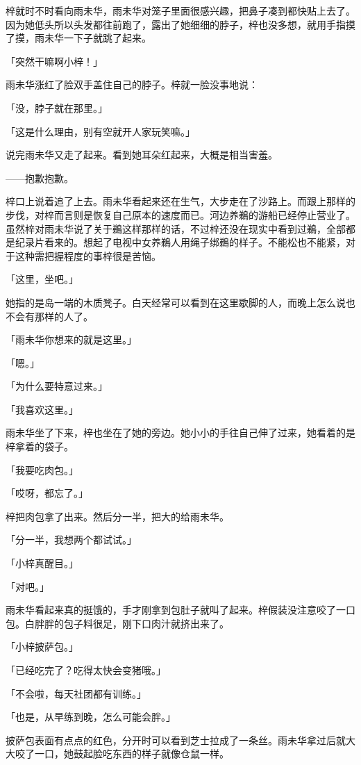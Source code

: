 \documentclass[UTF8]{ctexart}
\begin{document}
    梓就时不时看向雨未华，雨未华对笼子里面很感兴趣，把鼻子凑到都快贴上去了。因为她低头所以头发都往前跑了，露出了她细细的脖子，梓也没多想，就用手指摸了摸，雨未华一下子就跳了起来。

    「突然干嘛啊小梓！」

    雨未华涨红了脸双手盖住自己的脖子。梓就一脸没事地说：

    「没，脖子就在那里。」

    「这是什么理由，别有空就开人家玩笑嘛。」

    说完雨未华又走了起来。看到她耳朵红起来，大概是相当害羞。

    ——抱歉抱歉。

    梓口上说着追了上去。雨未华看起来还在生气，大步走在了沙路上。而跟上那样的步伐，对梓而言则是恢复自己原本的速度而已。河边养鵜的游船已经停止营业了。虽然梓对雨未华说了关于鵜这样那样的话，不过梓还没在现实中看到过鵜，全部都是纪录片看来的。想起了电视中女养鵜人用绳子绑鵜的样子。不能松也不能紧，对于这种需把握程度的事梓很是苦恼。

    「这里，坐吧。」

    她指的是岛一端的木质凳子。白天经常可以看到在这里歇脚的人，而晚上怎么说也不会有那样的人了。

    「雨未华你想来的就是这里。」

    「嗯。」

    「为什么要特意过来。」

    「我喜欢这里。」

    雨未华坐了下来，梓也坐在了她的旁边。她小小的手往自己伸了过来，她看着的是梓拿着的袋子。

    「我要吃肉包。」

    「哎呀，都忘了。」

    梓把肉包拿了出来。然后分一半，把大的给雨未华。

    「分一半，我想两个都试试。」

    「小梓真醒目。」

    「对吧。」

    雨未华看起来真的挺饿的，手才刚拿到包肚子就叫了起来。梓假装没注意咬了一口包。白胖胖的包子料很足，刚下口肉汁就挤出来了。

    「小梓披萨包。」

    「已经吃完了？吃得太快会变猪哦。」

    「不会啦，每天社团都有训练。」

    「也是，从早练到晚，怎么可能会胖。」

    披萨包表面有点点的红色，分开时可以看到芝士拉成了一条丝。雨未华拿过后就大大咬了一口，她鼓起脸吃东西的样子就像仓鼠一样。
\end{document}
